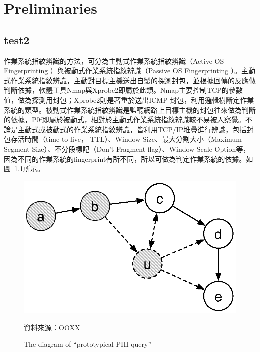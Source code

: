 \renewcommand\thefigure{\arabic{chapter}-\arabic{figure}} 

\chapter{Preliminaries}
\label{cha:preliminaries} 

\section{test2}
\label{sec:test2}

作業系統指紋辨識的方法，可分為主動式作業系統指紋辨識（Active OS Fingerprinting ）與被動式作業系統指紋辨識（Passive OS Fingerprinting ）。主動式作業系統指紋辨識，主動對目標主機送出自製的探測封包，並根據回傳的反應做判斷依據，軟體工具Nmap與Xprobe2即屬於此類。Nmap主要控制TCP的參數值，做為探測用封包；Xprobe2則是著重於送出ICMP 封包，利用邏輯樹斷定作業系統的類型。被動式作業系統指紋辨識是監聽網路上目標主機的封包往來做為判斷的依據，P0f即屬於被動式，相對於主動式作業系統指紋辨識較不易被人察覺。不論是主動式或被動式的作業系統指紋辨識，皆利用TCP/IP堆疊進行辨識，包括封包存活時間（time to live， TTL）、Window Size、最大分割大小（Maximum Segment Size）、不分段標記（Don't Fragment flag）、Window Scale Option等，因為不同的作業系統的fingerprint有所不同，所以可做為判定作業系統的依據。如圖~\ref{fig:PHI}所示。


\begin{figure}[H]
  \begin{center}
    \includegraphics[width=1.0\textwidth]{figures/dyna_rm.eps}
    \caption{The diagram of ``prototypical PHI query''} 
    資料來源：OOXX
    \label{fig:PHI}
  \end{center}
\end{figure}